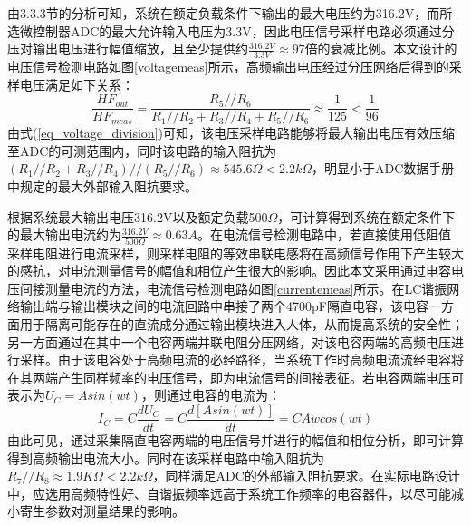 由3.3.3节的分析可知，系统在额定负载条件下输出的最大电压约为316.2V，而所选微控制器ADC的最大允许输入电压为3.3V，因此电压信号采样电路必须通过分压对输出电压进行幅值缩放，且至少提供约$\frac{316.2V}{3.3V} \approx 97$倍的衰减比例。本文设计的电压信号检测电路如图\ref{voltagemeas}所示，高频输出电压经过分压网络后得到的采样电压满足如下关系：
\begin{equation}
	\frac{HF_{out}}{HF_{meas}} = \frac{R_5//R_6}{R_1//R_2 + R_3//R_4+ R_5//R_6} \approx \frac{1}{125} < \frac{1}{96} \label{eq_voltage_division}
\end{equation}
由式(\ref{eq_voltage_division})可知，该电压采样电路能够将最大输出电压有效压缩至ADC的可测范围内，同时该电路的输入阻抗为$(R_1//R_2 + R_3//R_4)//(R_5//R_6) \approx 545.6\Omega < 2.2k\Omega$，明显小于ADC数据手册中规定的最大外部输入阻抗要求。

根据系统最大输出电压316.2V以及额定负载500$\Omega$，可计算得到系统在额定条件下的最大输出电流约为$\frac{316.2V}{500\Omega} \approx 0.63A$。在电流信号检测电路中，若直接使用低阻值采样电阻进行电流采样，则采样电阻的等效串联电感将在高频信号作用下产生较大的感抗，对电流测量信号的幅值和相位产生很大的影响。因此本文采用通过电容电压间接测量电流的方法，电流信号检测电路如图\ref{currentemeas}所示。在LC谐振网络输出端与输出模块之间的电流回路中串接了两个4700pF隔直电容，该电容一方面用于隔离可能存在的直流成分通过输出模块进入人体，从而提高系统的安全性；另一方面通过在其中一个电容两端并联电阻分压网络，对该电容两端的高频电压进行采样。由于该电容处于高频电流的必经路径，当系统工作时高频电流流经电容将在其两端产生同样频率的电压信号，即为电流信号的间接表征。若电容两端电压可表示为$U_{C} = Asin(wt)$，则通过电容的电流为：
\begin{equation}
	I_C = C\frac{dU_C}{dt} = C\frac{d[Asin(wt)]}{dt} = CAwcos(wt)
\end{equation}
由此可见，通过采集隔直电容两端的电压信号并进行的幅值和相位分析，即可计算得到高频输出电流大小。同时在该采样电路中输入阻抗为$R_7//R_8 \approx 1.9K\Omega < 2.2k\Omega$，同样满足ADC的外部输入阻抗要求。在实际电路设计中，应选用高频特性好、自谐振频率远高于系统工作频率的电容器件，以尽可能减小寄生参数对测量结果的影响。

